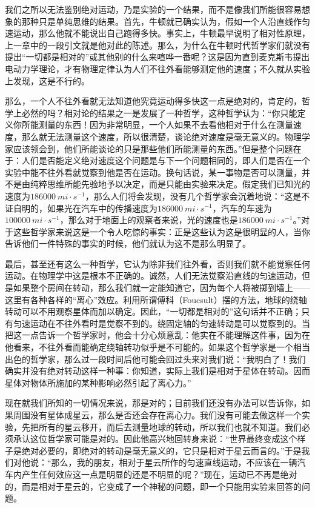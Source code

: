 我们之所以无法鉴别绝对运动，乃是实验的一个结果，而不是像我们所能很容易想象的那种只是单纯思维的结果。首先，牛顿就已确实认为，假如一个人沿直线作匀速运动，那么他就不能说出自己跑得多快。事实上，牛顿最早说明了相对性原理，上一章中的一段引文就是他对此的陈述。那么，为什么在牛顿时代哲学家们就没有提出“一切都是相对的”或其他别的什么来喧哗一番呢？这是因为直到麦克斯韦提出电动力学理论，才有物理定律认为人们不往外看能够测定他的速度；不久就从实验上发现，这是不行的。

那么，一个人不往外看就无法知道他究竟运动得多快这一点是绝对的，肯定的，哲学上必然的吗？相对论的结果之一是发展了一种哲学，这种哲学认为：“你只能定义你所能测量的东西！因为非常明显，一个人如果不去看他相对于什么在测量速度，那么就无法测量这个速度，所以很清楚，谈论绝对速度是毫无意义的。物理学家应该领会到，他们所能谈论的只是那些他们所能测量的东西。”但是整个问题在于：人们是否能定义绝对速度这个问题是与下一个问题相同的，即人们是否在一个实验中能不往外看就觉察到他是否在运动。换句话说，某一事物是否可以测量，并不是由纯粹思维所能先验地予以决定，而是只能由实验来决定。假定我们已知光的速度为$186000~mi \cdot s^{-1}$，那么人们将会发现，没有几个哲学家会沉着地说：“这是不证自明的，如果光在汽车中的传播速度为$186000~mi \cdot s^{-1}$，汽车的车速为$100000~mi \cdot s^{-1}$，那么对于地面上的观察者来说，光的速度也是$186000~mi \cdot s^{-1}$。”对于这些哲学家来说这是一个令人吃惊的事实：正是这些认为这是很明显的人，当你告诉他们一件特殊的事实的时候，他们就认为这不是那么明显了。

最后，甚至还有这么一种哲学，它认为除非我们往外看，否则我们就不能觉察任何运动。在物理学中这是根本不正确的。诚然，人们无法觉察沿直线的匀速运动，但是如果整个房间在转动，那么我们就一定能知道它，因为每个人将被掷到墙上——这里有各种各样的“离心”效应。利用所谓傅科（Foucsult）摆的方法，地球的绕轴转动可以不用观察星体而加以确定。因此，“一切都是相对的”这句话并不正确；只有匀速运动在不往外看时是觉察不到的。绕固定轴的匀速转动是可以觉察到的。当把这一点告诉一个哲学家时，他会十分心烦意乱：他实在不能理解这件事，因为在他看来，不往外看而能确定绕轴转功似乎是不可能的。如果这个哲学家是一个相当出色的哲学家，那么过一段时间后他可能会回过头来对我们说：“我明白了！我们确实并没有绝对转动这样一种事：你知道，实际上我们是相对于星体在转动。因而星体对物体所施加的某种影响必然引起了离心力。”

现在就我们所知的一切情况来说，那是对的；目前我们还没有办法可以告诉你，如果周围没有星体成星云，那么是否还会存在离心力。我们没有可能去做这样一个实验，先把所有的星云移开，而后去测量地球的转动，所以我们也就不知道。我们必须承认这位哲学家可能是对的。因此他高兴地回转身来说：“世界最终变成这个样子是绝对必要的，即绝对的转动是毫无意义的，它只是相对于星云而言的。”于是我们对他说：“那么，我的朋友，相对于星云所作的匀速直线运动，不应该在一辆汽车内产生任何效应这一点是明显的还是不明显的呢？”现在，运动已不再是绝对的，而是相对于星云的，它变成了一个神秘的问题，即一个只能用实验来回答的问题。

